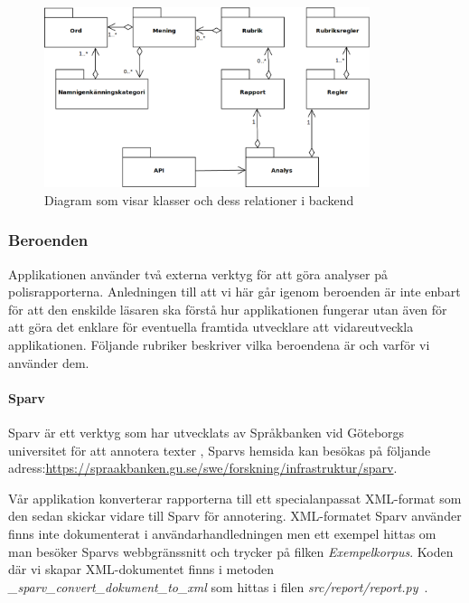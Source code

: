\documentclass[swedish]{maucsthesis}
\begin{document}
\begin{figure}[H]
    \centering
    \includegraphics[width=0.85\textwidth]{backendklasser}
    \caption{Diagram som visar klasser och dess relationer i backend}
    \label{fig:erdbackend}
\end{figure}

\subsubsection{Beroenden}

Applikationen använder två externa verktyg för att göra analyser på
polisrapporterna. Anledningen till att vi här går igenom beroenden är inte
enbart för att den enskilde läsaren ska förstå hur applikationen fungerar utan
även för att göra det enklare för eventuella framtida utvecklare att
vidareutveckla applikationen. Följande rubriker beskriver vilka beroendena är
och varför vi använder dem.

\paragraph*{Sparv}\label{sparv}
Sparv \cite{sprakbanken:2019} är ett verktyg som har utvecklats av Språkbanken vid Göteborgs universitet
för att annotera texter \cite{borin:2016}, Sparvs hemsida kan besökas på följande adress:\newline \url{https://spraakbanken.gu.se/swe/forskning/infrastruktur/sparv}. 

Vår applikation konverterar rapporterna till ett
specialanpassat XML-format som den sedan skickar vidare till Sparv för
annotering. XML-formatet Sparv använder finns inte dokumenterat i användarhandledningen men ett exempel
hittas om man besöker Sparvs webbgränssnitt \cite{sparv:2019} och trycker på filken \textit{Exempelkorpus}. Koden där vi
skapar XML-dokumentet finns i metoden \textit{\_sparv\_convert\_dokument\_to\_xml} som hittas i filen \textit{src/report/report.py}~\cite{kalle:2019}.
\end{document}
